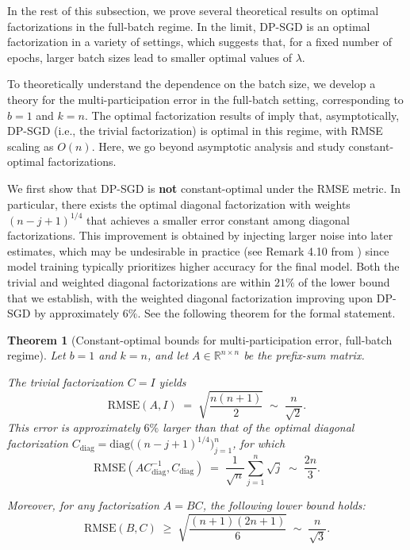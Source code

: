 \documentclass{article}
\theoremstyle{plain}
\newtheorem{theorem}{Theorem} %
\theoremstyle{definition}
\theoremstyle{remark}
\begin{document}
In the rest of this subsection, we prove several theoretical results on optimal factorizations in the full-batch regime. In the limit, DP-SGD is an optimal factorization in a variety of settings, which suggests that, for a fixed number of epochs, larger batch sizes lead to smaller optimal values of $\lambda$.



To theoretically understand the dependence on the batch size, we develop a theory for the
multi-participation error in the full-batch setting, corresponding to $b = 1$ and $k = n$.
The optimal factorization results of \citet{kalinin2025back} imply that, asymptotically,
DP-SGD (i.e., the trivial factorization) is optimal in this regime, with RMSE scaling as
$O(n)$. Here, we go beyond asymptotic analysis and study constant-optimal factorizations.

We first show that DP-SGD is \textbf{not} constant-optimal under the RMSE metric. In
particular, there exists the optimal diagonal factorization with weights $(n - j + 1)^{1/4}$ that
achieves a smaller error constant among diagonal factorizations. This improvement is obtained by injecting larger noise
into later estimates, which may be undesirable in practice (see Remark 4.10 from \citet{pillutla2025correlated}) since model training typically
prioritizes higher accuracy for the final model. Both the trivial and weighted diagonal
factorizations are within $21\%$ of the lower bound that we establish, with the weighted
diagonal factorization improving upon DP-SGD by approximately $6\%$. See the following
theorem for the formal statement.

\begin{theorem}[Constant-optimal bounds for multi-participation error, full-batch regime]
\label{thm:full_batch_constants}
Let $b = 1$ and $k = n$, and let $A \in \mathbb{R}^{n \times n}$ be the prefix-sum matrix.

The trivial factorization $C = I$ yields
\begin{equation}
    \mathrm{RMSE}(A, I)
    \;=\;
    \sqrt{\frac{n(n+1)}{2}}
    \;\sim\;
    \frac{n}{\sqrt{2}}.
\end{equation}
This error is approximately $6\%$ larger than that of the optimal diagonal factorization
$C_{\mathrm{diag}} = \mathrm{diag}\!\big( (n - j + 1)^{1/4} \big)_{j=1}^n$, for which
\begin{equation}
    \mathrm{RMSE}(A C^{-1}_{\mathrm{diag}}, C_{\mathrm{diag}})
    \;=\;
    \frac{1}{\sqrt{n}} \sum_{j=1}^n \sqrt{j}
    \;\sim\;
    \frac{2n}{3}.
\end{equation}

Moreover, for any factorization $A = BC$, the following lower bound holds:
\begin{equation}
    \mathrm{RMSE}(B, C)
    \;\ge\;
    \sqrt{\frac{(n+1)(2n+1)}{6}}
    \;\sim\;
    \frac{n}{\sqrt{3}}.
\end{equation}
\end{theorem}
\end{document}

